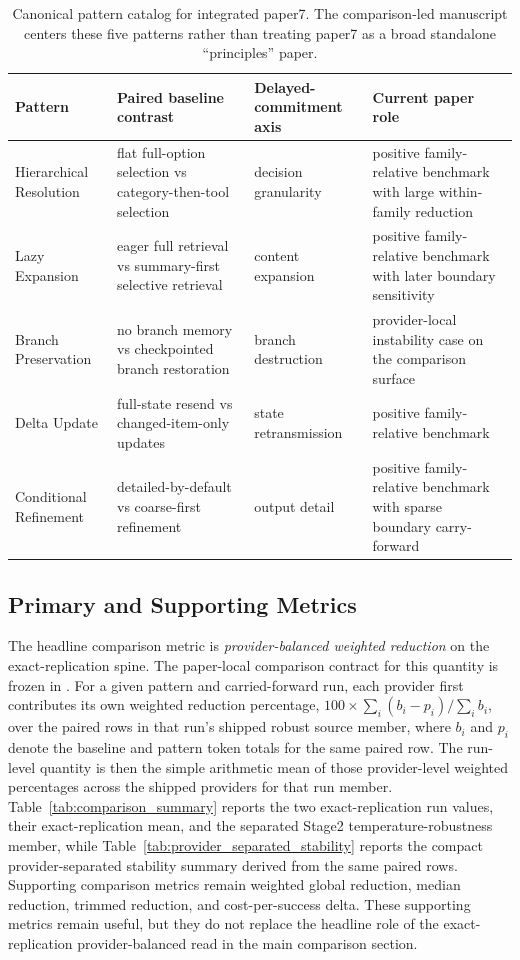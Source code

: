 \documentclass[11pt,a4paper]{article}
\begin{document}
\begin{table}[t]
\centering
\small
\begin{tabular}{L{3.0cm}L{4.2cm}L{2.5cm}L{4.0cm}}
\toprule
\textbf{Pattern} & \textbf{Paired baseline contrast} & \textbf{Delayed-commitment axis} & \textbf{Current paper role} \\
\midrule
Hierarchical Resolution & flat full-option selection vs category-then-tool selection & decision granularity & positive family-relative benchmark with large within-family reduction \\
Lazy Expansion & eager full retrieval vs summary-first selective retrieval & content expansion & positive family-relative benchmark with later boundary sensitivity \\
Branch Preservation & no branch memory vs checkpointed branch restoration & branch destruction & provider-local instability case on the comparison surface \\
Delta Update & full-state resend vs changed-item-only updates & state retransmission & positive family-relative benchmark \\
Conditional Refinement & detailed-by-default vs coarse-first refinement & output detail & positive family-relative benchmark with sparse boundary carry-forward \\
\bottomrule
\end{tabular}
\caption{Canonical pattern catalog for integrated paper7. The comparison-led manuscript centers these five patterns rather than treating paper7 as a broad standalone ``principles'' paper.}
\label{tab:pattern_catalog}
\end{table}

\subsection{Primary and Supporting Metrics}

The headline comparison metric is \emph{provider-balanced weighted reduction} on the exact-replication spine. The paper-local comparison contract for this quantity is frozen in . For a given pattern and carried-forward run, each provider first contributes its own weighted reduction percentage, \(100 \times \sum_i (b_i - p_i) / \sum_i b_i\), over the paired rows in that run's shipped robust source member, where \(b_i\) and \(p_i\) denote the baseline and pattern token totals for the same paired row. The run-level quantity  is then the simple arithmetic mean of those provider-level weighted percentages across the shipped providers for that run member. Table~\ref{tab:comparison_summary} reports the two exact-replication run values, their exact-replication mean, and the separated Stage2 temperature-robustness member, while Table~\ref{tab:provider_separated_stability} reports the compact provider-separated stability summary derived from the same paired rows. Supporting comparison metrics remain weighted global reduction, median reduction, trimmed reduction, and cost-per-success delta. These supporting metrics remain useful, but they do not replace the headline role of the exact-replication provider-balanced read in the main comparison section.
\end{document}
